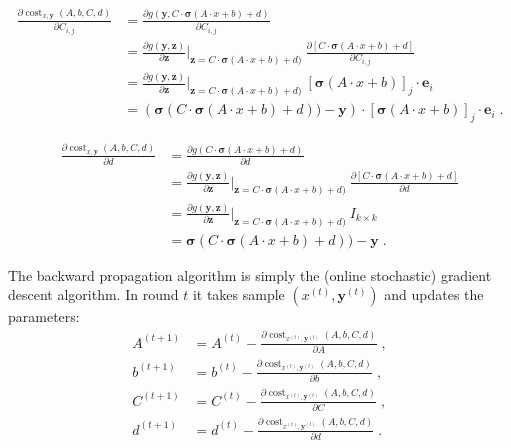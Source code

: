 \documentclass[12pt]{article}
\DeclareMathOperator{\cost}{cost}
\newcommand{\bsigma}{\pmb{\sigma}}
\newcommand{\y}{\mathbf{y}}
\newcommand{\z}{\mathbf{z}}
\newcommand{\e}{\mathbf{e}}
\begin{document}
\begin{align*}
\frac{\partial \cost_{x,\y}(A,b,C,d)}{\partial C_{i,j}}
& = \frac{\partial g(\y, C \cdot \bsigma(A \cdot x + b) + d)}{\partial C_{i,j}} \\
& = \frac{\partial g(\y, \z)}{\partial \z}\bigg|_{\z=C \cdot \bsigma(A \cdot x + b) + d)} \ \frac{\partial [C \cdot \bsigma(A \cdot x + b) + d]}{\partial C_{i,j}} \\
& = \frac{\partial g(\y, \z)}{\partial \z}\bigg|_{\z=C \cdot \bsigma(A \cdot x + b) + d)} \ [\bsigma(A \cdot x + b)]_j \cdot \e_i \\
& = \left(\bsigma(C \cdot \bsigma(A \cdot x + b) + d))  - \y \right) \cdot [\bsigma(A \cdot x + b)]_j \cdot \e_i \; .
\end{align*}

\begin{align*}
\frac{\partial \cost_{x,\y}(A,b,C,d)}{\partial d}
& = \frac{\partial g(C \cdot \bsigma(A \cdot x + b) + d)}{\partial d} \\
& = \frac{\partial g(\y, \z)}{\partial \z}\bigg|_{\z=C \cdot \bsigma(A \cdot x + b) + d)} \ \frac{\partial [C \cdot \bsigma(A \cdot x + b) + d]}{\partial d} \\
& = \frac{\partial g(\y, \z)}{\partial \z}\bigg|_{\z=C \cdot \bsigma(A \cdot x + b) + d)} \ I_{k \times k} \\
& = \bsigma(C \cdot \bsigma(A \cdot x + b) + d)) - \y \; .
\end{align*}

The backward propagation algorithm is simply the (online stochastic) gradient descent algorithm.
In round $t$ it takes sample $(x^{(t)}, \y^{(t)})$ and updates the parameters:
\begin{align*}
A^{(t+1)} & = A^{(t)} - \frac{\partial \cost_{x^{(t)},\y^{(t)}}(A,b,C,d)}{\partial A} \; , \\
b^{(t+1)} & = b^{(t)} - \frac{\partial \cost_{x^{(t)},\y^{(t)}}(A,b,C,d)}{\partial b} \; , \\
C^{(t+1)} & = C^{(t)} - \frac{\partial \cost_{x^{(t)},\y^{(t)}}(A,b,C,d)}{\partial C} \; , \\
d^{(t+1)} & = d^{(t)} - \frac{\partial \cost_{x^{(t)},\y^{(t)}}(A,b,C,d)}{\partial d} \; .
\end{align*}
\end{document}
